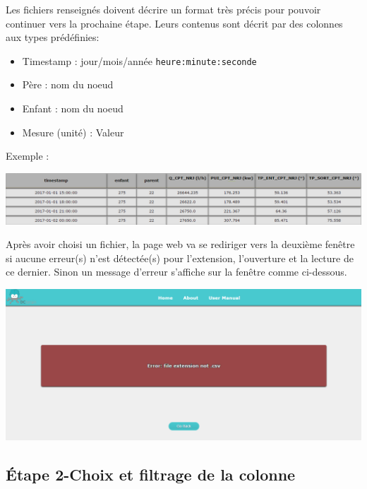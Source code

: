 		Les fichiers renseignés doivent décrire un format très précis pour pouvoir continuer vers la prochaine étape. Leurs contenus sont décrit par des colonnes aux types prédéfinies:
		\begin{itemize}
		\item Timestamp : jour/mois/année	\lstinline!heure:minute:seconde!
		\item Père : nom du noeud
		\item Enfant : nom du noeud
		\item Mesure (unité) : Valeur
		\end{itemize}
		Exemple :
		\begin{center}\includegraphics[scale=0.52]{exampleCSV.png}\end{center}
		
		Après avoir choisi un fichier, la page web va se rediriger vers la deuxième fenêtre si aucune erreur(s) n'est détectée(s) pour l'extension, l'ouverture et la lecture de ce dernier. Sinon un message d'erreur s'affiche sur la fenêtre comme ci-dessous.\\
		
				
	\begin{center}\includegraphics[scale=0.45]{fenetreErreur.png}\end{center}
			
	\subsection{Étape 2-Choix et filtrage de la colonne}
	
